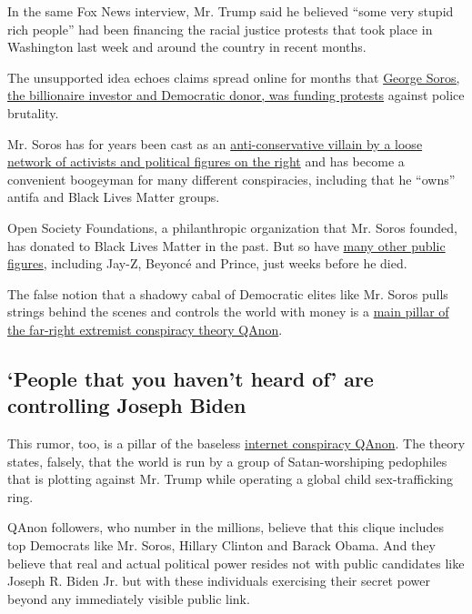 In the same Fox News interview, Mr. Trump said he believed ``some very
stupid rich people'' had been financing the racial justice protests that
took place in Washington last week and around the country in recent
months.

The unsupported idea echoes claims spread online for months that
\href{https://www.nytimes3xbfgragh.onion/2020/06/01/technology/george-floyd-misinformation-online.html}{George
Soros, the billionaire investor and Democratic donor, was funding
protests} against police brutality.

Mr. Soros has for years been cast as an
\href{https://www.nytimes3xbfgragh.onion/2018/05/29/us/roseanne-george-soros-twitter.html}{anti-conservative
villain by a loose network of activists and political figures on the
right} and has become a convenient boogeyman for many different
conspiracies, including that he ``owns'' antifa and Black Lives Matter
groups.

Open Society Foundations, a philanthropic organization that Mr. Soros
founded, has donated to Black Lives Matter in the past. But so have
\href{https://www.cbsnews.com/news/black-lives-matter-network-establishes-12m-grant-fund/}{many
other public figures}, including Jay-Z, Beyoncé and Prince, just weeks
before he died.

The false notion that a shadowy cabal of Democratic elites like Mr.
Soros pulls strings behind the scenes and controls the world with money
is a
\href{https://www.nytimes3xbfgragh.onion/article/what-is-qanon.html}{main
pillar of the far-right extremist conspiracy theory QAnon}.

\hypertarget{people-that-you-havent-heard-of-are-controlling-joseph-biden}{%
\subsection{`People that you haven't heard of' are controlling Joseph
Biden}\label{people-that-you-havent-heard-of-are-controlling-joseph-biden}}

This rumor, too, is a pillar of the baseless
\href{https://www.nytimes3xbfgragh.onion/article/what-is-qanon.html}{internet
conspiracy QAnon}. The theory states, falsely, that the world is run by
a group of Satan-worshiping pedophiles that is plotting against Mr.
Trump while operating a global child sex-trafficking ring.

QAnon followers, who number in the millions, believe that this clique
includes top Democrats like Mr. Soros, Hillary Clinton and Barack Obama.
And they believe that real and actual political power resides not with
public candidates like Joseph R. Biden Jr. but with these individuals
exercising their secret power beyond any immediately visible public
link.

